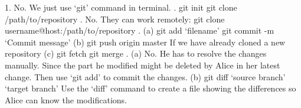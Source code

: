\documentclass{report}
\begin{document}
\begin{problem}
  \begin{answer}{37em}
  1. No. We just use `git' command in terminal. \newline{}. git init \newline
  git clone /path/to/repository \newline{}. No. They can work remotely: \newline
  git clone username@host:/path/to/repository \newline{}. (a) git add `filename' \newline
  git commit -m `Commit message' \newline
  (b) git push origin master 
  \newline
  If we have already cloned a new repository \newline
  (c) git fetch \newline
  git merge \newline{}. (a) No. He has to resolve the changes manually. Since the part he modified might be deleted by Alice in her latest change. Then use `git add' to commit the changes.
  \newline
  (b) git diff `source branch' `target branch' \newline
  Use the `diff' command to create a file showing the differences so Alice can know the modifications.\newline
  \end{answer}

\end{problem}

\newpage
\end{document}
